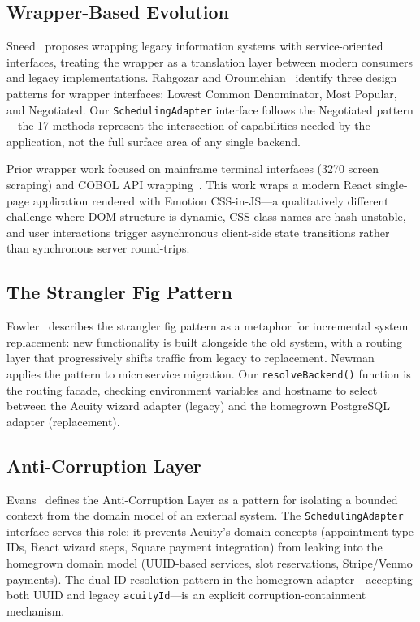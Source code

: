 \documentclass[conference]{IEEEtran}
\begin{document}
\subsection{Wrapper-Based Evolution}

Sneed~\cite{sneed-wrapping} proposes wrapping legacy information systems with service-oriented interfaces, treating the wrapper as a translation layer between modern consumers and legacy implementations. Rahgozar and Oroumchian~\cite{rahgozar-patterns} identify three design patterns for wrapper interfaces: Lowest Common Denominator, Most Popular, and Negotiated. Our \texttt{SchedulingAdapter} interface follows the Negotiated pattern---the 17 methods represent the intersection of capabilities needed by the application, not the full surface area of any single backend.

Prior wrapper work focused on mainframe terminal interfaces (3270 screen scraping) and COBOL API wrapping~\cite{sei-legacy}. This work wraps a modern React single-page application rendered with Emotion CSS-in-JS---a qualitatively different challenge where DOM structure is dynamic, CSS class names are hash-unstable, and user interactions trigger asynchronous client-side state transitions rather than synchronous server round-trips.

\subsection{The Strangler Fig Pattern}

Fowler~\cite{fowler-strangler} describes the strangler fig pattern as a metaphor for incremental system replacement: new functionality is built alongside the old system, with a routing layer that progressively shifts traffic from legacy to replacement. Newman~\cite{newman-microservices} applies the pattern to microservice migration. Our \texttt{resolveBackend()} function is the routing facade, checking environment variables and hostname to select between the Acuity wizard adapter (legacy) and the homegrown PostgreSQL adapter (replacement).

\subsection{Anti-Corruption Layer}

Evans~\cite{evans-ddd} defines the Anti-Corruption Layer as a pattern for isolating a bounded context from the domain model of an external system. The \texttt{SchedulingAdapter} interface serves this role: it prevents Acuity's domain concepts (appointment type IDs, React wizard steps, Square payment integration) from leaking into the homegrown domain model (UUID-based services, slot reservations, Stripe/Venmo payments). The dual-ID resolution pattern in the homegrown adapter---accepting both UUID and legacy \texttt{acuityId}---is an explicit corruption-containment mechanism.
\end{document}
